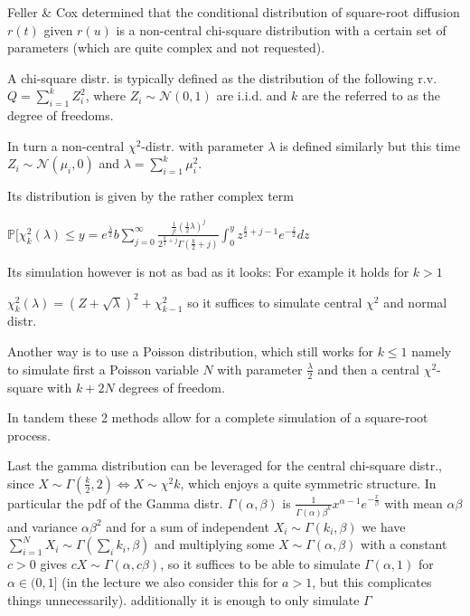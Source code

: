 Feller \& Cox determined that the conditional distribution of square-root diffusion \( r(t) \)
given \( r(u) \) is a non-central chi-square distribution with a certain set of parameters (which are quite complex and not requested).

A chi-square distr. is typically defined as the distribution
of the following r.v.
\( Q = \sum_{i=1}^{k} Z_i^2 \), where \( Z_i \sim \mathcal{N}(0, 1) \) are i.i.d.
and \( k \) are the referred to as the degree of freedoms.

In turn a non-central \( \chi^2 \)-distr. with parameter \( \lambda \) is defined similarly but this time \( Z_i \sim \mathcal{N}(\mu_i, 0) \)
and \( \lambda = \sum_{i=1}^k \mu_i^2 \).

Its distribution is given by the rather complex term

\( \mathbb{P}[\chi^2_{k}(\lambda) \leq y = e^{\frac{\lambda}{2}}b\sum_{j=0}^{\infty} \frac{\frac{1}{j!}(\frac{1}{2}\lambda)^j}{2^{\frac{k}{2}+j}\Gamma(\frac{k}{2}+j)} \int_{0}^{y} z^{\frac{k}{2} + j -1} e^{-\frac{z}{2}}dz \)

Its simulation however is not as bad as it looks:
For example it holds for \( k > 1 \)

\( \chi^2_k(\lambda) = (Z + \sqrt{\lambda})^2 + \chi^2_{k-1} \)
so it suffices to simulate central \( \chi^2 \) and normal distr.

Another way is to use a Poisson distribution, which still works for \( k \leq 1 \)
namely to simulate first a Poisson variable \( N \) with parameter \( \frac{\lambda}{2} \)
and then a central \( \chi^2 \)-square with \( k + 2N \) degrees of freedom.

In tandem these 2 methods allow for a complete simulation of a square-root process.

Last the gamma distribution can be leveraged for the central chi-square distr., since \( X \sim \Gamma(\frac{k}{2}, 2) \iff X \sim \chi^2{k}\),
which enjoys a quite symmetric structure.
In particular the pdf of the Gamma distr. \( \Gamma(\alpha, \beta) \) is
\( \frac{1}{\Gamma(\alpha)\beta^k}x^{\alpha-1}e^{-\frac{x}{\beta}} \)
with mean \( \alpha\beta \) and variance \( \alpha\beta^2 \) and for a sum of independent \( X_i \sim \Gamma(k_i, \beta)\)
we have \( \sum_{i=1}^{N} X_i \sim \Gamma(\sum_i k_i, \beta) \) and multiplying some \( X \sim \Gamma(\alpha, \beta) \) with a constant \( c > 0 \)
gives \( cX \sim \Gamma(\alpha, c\beta) \), so it suffices to be able to simulate \( \Gamma(\alpha, 1) \) for \( \alpha \in (0, 1] \) 
(in the lecture we also consider this for \( a > 1 \), but this complicates things unnecessarily).
additionally it is enough to only simulate \( \Gamma \)


